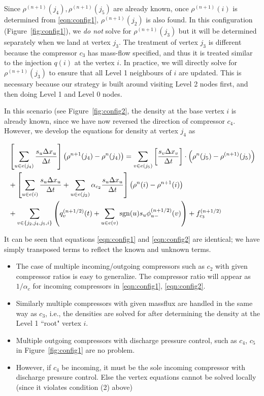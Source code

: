 \documentclass{amsart}
\DeclareMathOperator{\sgn}{sgn}
\begin{document}
Since $\rho^{(n+1)}(j_4), \rho^{(n+1)}(j_5)$ are already known, once $\rho^{(n+1)}(i)$ is determined from \eqref{eqn:config1}, $\rho^{(n+1)}(j_2)$ is also found. 
In this configuration (Figure~\ref{fig:config1}), we \emph{do not} solve for $\rho^{(n+1)}(j_3)$ but it will be determined separately when we land at vertex $j_3$. The treatment of vertex $j_3$ is different because the compressor $c_3$ has mass-flow specified, and thus it is treated similar to the injection $q(i)$  at the vertex $i$. In practice, we will directly solve for $\rho^{(n+1)}(j_3)$ to ensure that all Level 1 neighbours of $i$ are updated. This is necessary because our strategy is built around visiting  Level 2 nodes first, and then doing Level 1 and Level 0 nodes.



In this scenario (see Figure~\ref{fig:config2}, the density at the base vertex $i$ is already known, since we have now reversed the direction of compressor $c_4$. However, we develop the equations for density at vertex $j_4$ as 

\begin{align}
& \left[ \sum_{u \in e(j_4)}\frac{s_{u} \Delta x_{u}}{\Delta t} \right] \left ( \rho^{n+1}(j_4) - \rho^{n}(j_4) \right)  = \sum_{v \in e(j_5)}\left[\frac{s_{v} \Delta x_{v}}{\Delta t}\right] \cdot \left(\rho^{n}(j_5) - \rho^{(n+1)}(j_5) \right)  \notag \\
& + \left[ \sum_{u \in e(i)}\frac{s_{u} \Delta x_{u}}{\Delta t} + \sum_{u \in e(j_2)}\alpha_{c_2}\frac{s_{u} \Delta x_{u}}{\Delta t} \right]\left( \rho^n(i) - \rho^{n+1}(i) \right) \notag \\
& +\sum_{v \in \{j_2, j_4, j_5, i\}} \left( q^{(n+1/2)}_{v}(t) + \sum_{u \in e(v)}\sgn(u) s_{u} \phi_{u-}^{(n+1/2)}(v) \right) + f^{(n+1/2)}_{c_3}
\label{eqn:config2}
\end{align}

It can be seen that equations \eqref{eqn:config1} and \eqref{eqn:config2} 
are identical; we have simply transposed terms to reflect the known and unknown terms.

\begin{itemize}
\item The case of multiple incoming/outgoing compressors such as $c_2$ with given compressor ratios is easy to generalize. The compressor ratio will appear as $1/\alpha_c$ for incoming compressors in \eqref{eqn:config1}, \eqref{eqn:config2}. 
\item Similarly multiple compressors with given massflux are handled in the same way as  $c_3$, i.e., the densities are solved for after determining the density at the Level 1 ``root" vertex $i$.
\item Multiple outgoing compressors with discharge pressure control, such as $c_4$, $c_5$ in Figure~\ref{fig:config1} are no problem.
\item However, if $c_4$ be incoming, it must be the sole incoming compressor with discharge pressure control. Else the vertex equations cannot be solved locally (since it violates condition (2) above)
\end{itemize}
\end{document}
